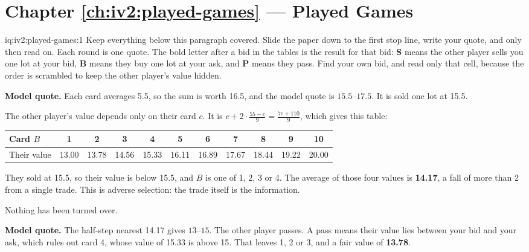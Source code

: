 \section*{Chapter \ref{ch:iv2:played-games} --- Played Games}

\begin{solution}{iq:iv2:played-games:1}
Keep everything below this paragraph covered. Slide the paper down to the first stop line, write your quote, and only then read on. Each round is one quote. The bold letter after a bid in the tables is the result for that bid: \textbf{S} means the other player sells you one lot at your bid, \textbf{B} means they buy one lot at your ask, and \textbf{P} means they pass. Find your own bid, and read only that cell, because the order is scrambled to keep the other player's value hidden.

\ivstop

\textbf{Model quote.} Each card averages 5.5, so the sum is worth 16.5, and the model quote is $15.5$--$17.5$. It is sold one lot at 15.5.

The other player's value depends only on their card $c$. It is $c + 2 \cdot \frac{55 - c}{9} = \frac{7c + 110}{9}$, which gives this table:
\begin{center}\small
\begin{tabular}{@{}l*{10}{c}@{}}
Card $B$ & 1 & 2 & 3 & 4 & 5 & 6 & 7 & 8 & 9 & 10 \\ \hline
Their value & 13.00 & 13.78 & 14.56 & 15.33 & 16.11 & 16.89 & 17.67 & 18.44 & 19.22 & 20.00
\end{tabular}
\end{center}
They sold at 15.5, so their value is below 15.5, and $B$ is one of 1, 2, 3 or 4. The average of those four values is \textbf{14.17}, a fall of more than 2 from a single trade. This is adverse selection: the trade itself is the information.

Nothing has been turned over.
\ivstop

\textbf{Model quote.} The half-step nearest 14.17 gives $13$--$15$. The other player passes. A pass means their value lies between your bid and your ask, which rules out card 4, whose value of 15.33 is above 15. That leaves 1, 2 or 3, and a fair value of \textbf{13.78}.


\end{solution}
